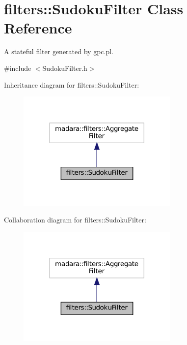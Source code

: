 \hypertarget{classfilters_1_1SudokuFilter}{}\section{filters\+:\+:Sudoku\+Filter Class Reference}
\label{classfilters_1_1SudokuFilter}


A stateful filter generated by gpc.\+pl.  




{\ttfamily \#include $<$Sudoku\+Filter.\+h$>$}



Inheritance diagram for filters\+:\+:Sudoku\+Filter\+:\nopagebreak
\begin{figure}[H]
\begin{center}
\leavevmode
\includegraphics[width=224pt]{d5/d7f/classfilters_1_1SudokuFilter__inherit__graph}
\end{center}
\end{figure}


Collaboration diagram for filters\+:\+:Sudoku\+Filter\+:\nopagebreak
\begin{figure}[H]
\begin{center}
\leavevmode
\includegraphics[width=224pt]{d5/d58/classfilters_1_1SudokuFilter__coll__graph}
\end{center}
\end{figure}
